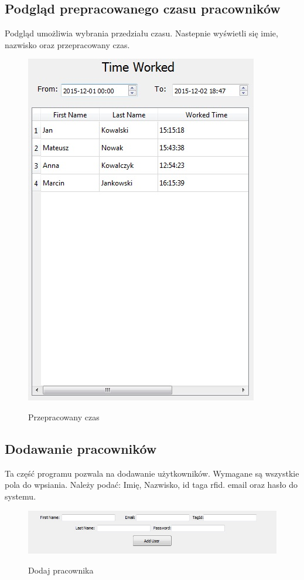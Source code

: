 \subsection{Podgląd prepracowanego czasu pracowników}
Podgląd umożliwia wybrania przedziału czasu. Nastepnie wyświetli się imie, nazwisko oraz przepracowany czas.
\begin{figure}[h!]
	\centering
	\includegraphics[]{img/time_worked.jpg}
	\label{fig:time_worked}
	\caption[Przepracowany czas]{Przepracowany czas}
\end{figure}
\newpage
\subsection{Dodawanie pracowników}
Ta część programu pozwala na dodawanie użytkowników. Wymagane są wszystkie pola do wpsiania.
Należy podać: Imię, Nazwisko, id taga rfid. email oraz hasło do systemu.
\begin{figure}[h!]
	\centering
	\includegraphics[]{img/add_user.jpg}
	\label{fig:add_user}
	\caption[Dodaj pracownika]{Dodaj pracownika}
\end{figure}
